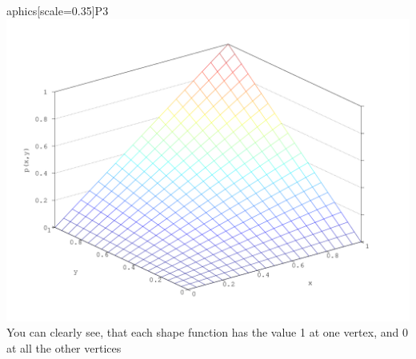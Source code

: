 \documentclass[a4paper,12pt]{article}
\begin{document}
aphics[scale=0.35]{P3} \includegraphics[scale=0.35]{P4}
You can clearly see, that each shape function has the value 1 at one vertex, and 0 at all the other vertices
\end{document}
